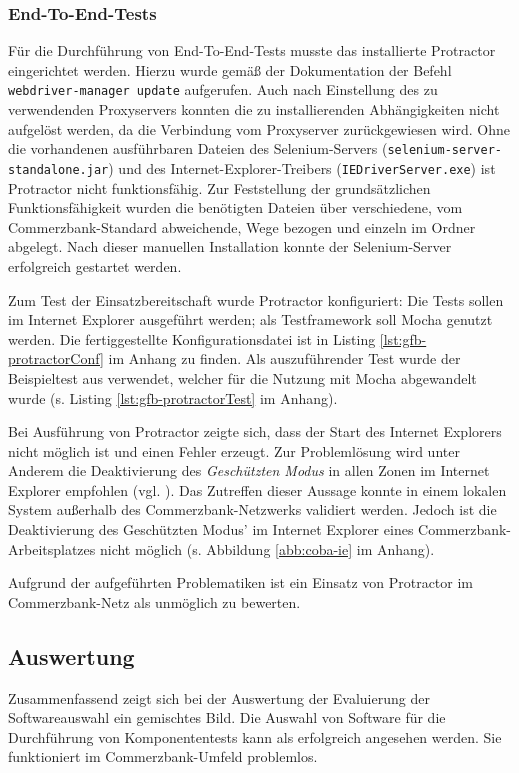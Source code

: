\subsubsection{End-To-End-Tests}
Für die Durchführung von End-To-End-Tests musste das installierte Protractor eingerichtet werden. Hierzu wurde gemäß der Dokumentation  \cite{protractor-index} der Befehl \texttt{webdriver-manager update} aufgerufen. Auch nach Einstellung des zu verwendenden Proxyservers konnten die zu installierenden Abhängigkeiten nicht aufgelöst werden, da die Verbindung vom Proxyserver zurückgewiesen wird. Ohne die vorhandenen ausführbaren Dateien des Selenium-Servers (\texttt{selenium-server-standalone.jar}) und des Internet-Explorer-Treibers (\texttt{IEDriverServer.exe}) ist Protractor nicht funktionsfähig. Zur Feststellung der grundsätzlichen Funktionsfähigkeit wurden die benötigten Dateien über verschiedene, vom Commerzbank-Standard abweichende, Wege bezogen und einzeln im Ordner abgelegt. Nach dieser manuellen Installation konnte der Selenium-Server erfolgreich gestartet werden. 

Zum Test der Einsatzbereitschaft wurde Protractor konfiguriert: Die Tests sollen im Internet Explorer ausgeführt werden; als Testframework soll Mocha genutzt werden. Die fertiggestellte Konfigurationsdatei ist in Listing \ref{lst:gfb-protractorConf} im Anhang zu finden. Als auszuführender Test wurde der Beispieltest aus  \cite{protractor-index} verwendet, welcher für die Nutzung mit Mocha abgewandelt wurde (s. Listing \ref{lst:gfb-protractorTest} im Anhang).

Bei Ausführung von Protractor zeigte sich, dass der Start des Internet Explorers nicht möglich ist und einen Fehler erzeugt. Zur Problemlösung wird unter Anderem die Deaktivierung des \textit{Geschützten Modus} in allen Zonen im Internet Explorer empfohlen (vgl.  \cite{bug-ie-1, bug-ie-2}). Das Zutreffen dieser Aussage konnte in einem lokalen System außerhalb des Commerzbank-Netzwerks validiert werden. Jedoch ist die Deaktivierung des Geschützten Modus' im Internet Explorer eines Commerzbank-Arbeitsplatzes nicht möglich (s. Abbildung \ref{abb:coba-ie} im Anhang).

Aufgrund der aufgeführten Problematiken ist ein Einsatz von Protractor im Commerzbank-Netz als unmöglich zu bewerten.

\subsection{Auswertung}
Zusammenfassend zeigt sich bei der Auswertung der Evaluierung der Softwareauswahl ein gemischtes Bild. Die Auswahl von Software für die Durchführung von Komponententests kann als erfolgreich angesehen werden. Sie funktioniert im Commerzbank-Umfeld problemlos.

